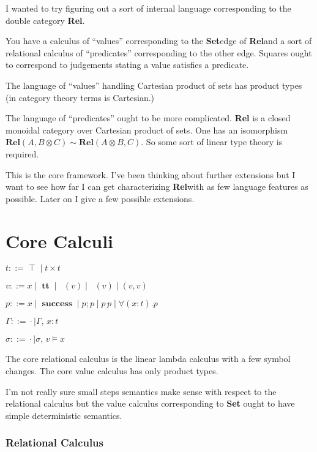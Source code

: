 \documentclass[twocolumn]{scrartcl}
\newcommand{\Rel}{\textbf{Rel}}
\newcommand{\Set}{\textbf{Set}}
\newcommand{\bnfdef}{\mathrel{::=}}
\DeclareMathOperator{\unit}{\top}
\DeclareMathOperator{\coin}{\textbf{tt}}
\DeclareMathOperator{\fst}{\pi_1}
\DeclareMathOperator{\snd}{\pi_2}
\DeclareMathOperator{\success}{\textbf{success}}
\newcommand{\pass}{;}
\begin{document}
I wanted to try figuring out a sort of internal language corresponding
to the double category \Rel.

You have a calculus of ``values'' corresponding to the \Set edge of
\Rel and a sort of relational calculus of ``predicates'' corresponding
to the other edge. Squares ought to correspond to judgements stating a
value satisfies a predicate.

The language of ``values'' handling Cartesian product of sets has
product types (in category theory terms is Cartesian.)

The language of ``predicates'' ought to be more complicated. \Rel
is a closed monoidal category over Cartesian product of sets.  One has
an isomorphism \( \Rel(A, B \otimes C) \sim \Rel (A \otimes B, C) \).
So some sort of linear type theory is required.

This is the core framework.  I've been thinking about further
extensions but I want to see how far I can get characterizing
\Rel with as few language features as possible.  Later on I
give a few possible extensions.

\section*{Core Calculi}

\begin{description}[nosep]
\item[Types] \hfill \( t \bnfdef \unit \mid t \times t \)
\item[Values] \hfill \( v \bnfdef x \mid \coin \mid \fst(v) \mid \snd(v) \mid ( v , v ) \)
\item[Predicates] \hfill \( p \bnfdef x \mid \success \mid p \pass p \mid p \, p \mid \forall (x \colon t) . p \)
\item[Environment] \hfill \( \Gamma \bnfdef \cdot \mid \Gamma , \, x \colon t  \)
\item[Substitutions] \hfill \( \sigma \bnfdef \cdot \mid \sigma , \, v \models x  \)
\end{description}

The core relational calculus is the linear lambda calculus with a few
symbol changes.  The core value calculus has only product types.

I'm not really sure small steps semantics make sense with respect to
the relational calculus but the value calculus corresponding to \Set
ought to have simple deterministic semantics.

\subsubsection*{Relational Calculus}
\end{document}
